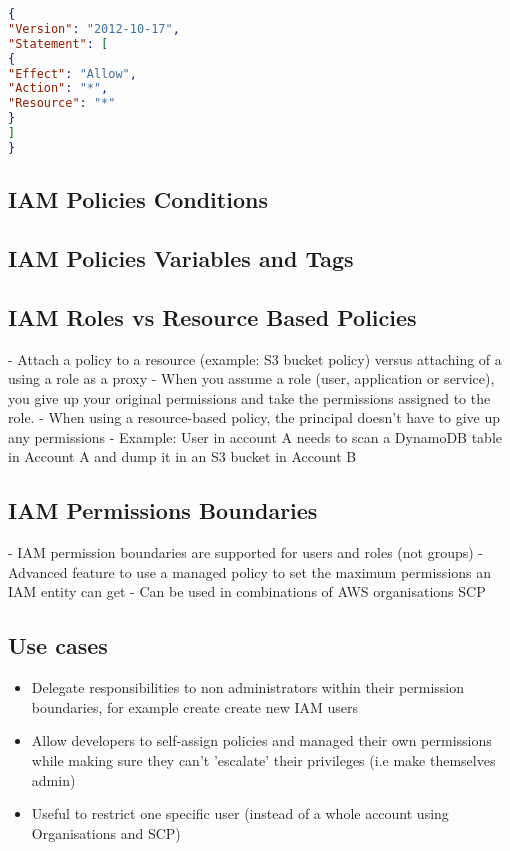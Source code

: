 \documentclass[11pt]{book}
\begin{document}
    \begin{lstlisting}[language=JSON, caption=Sample JSON Data, label=lst:json-example]
{
"Version": "2012-10-17",
"Statement": [
{
"Effect": "Allow",
"Action": "*",
"Resource": "*"
}
]
}
    \end{lstlisting}

    \subsection{IAM Policies Conditions}

    \subsection{IAM Policies Variables and Tags}

    \subsection{IAM Roles vs Resource Based Policies}
    - Attach a policy to a resource (example: S3 bucket policy) versus attaching of a using a role as a proxy
    - When you assume a role (user, application or service), you give up your original permissions and take the permissions assigned to the role.
    - When using a resource-based policy, the principal doesn't have to give up any permissions
    - Example: User in account A needs to scan a DynamoDB table in Account A and dump it in an S3 bucket in Account B

    \subsection{IAM Permissions Boundaries}
    - IAM permission boundaries are supported for users and roles (not groups)
    - Advanced feature to use a managed policy to set the maximum permissions an IAM entity can get
    - Can be used in combinations of AWS organisations SCP

    \subsection{Use cases}

    \begin{itemize}
        \item Delegate responsibilities to non administrators within their permission boundaries, for example create create new IAM users
        \item Allow developers to self-assign policies and managed their own permissions while making sure they can't 'escalate' their privileges (i.e make themselves admin)
        \item Useful to restrict one specific user (instead of a whole account using Organisations and SCP)
    \end{itemize}
\end{document}
